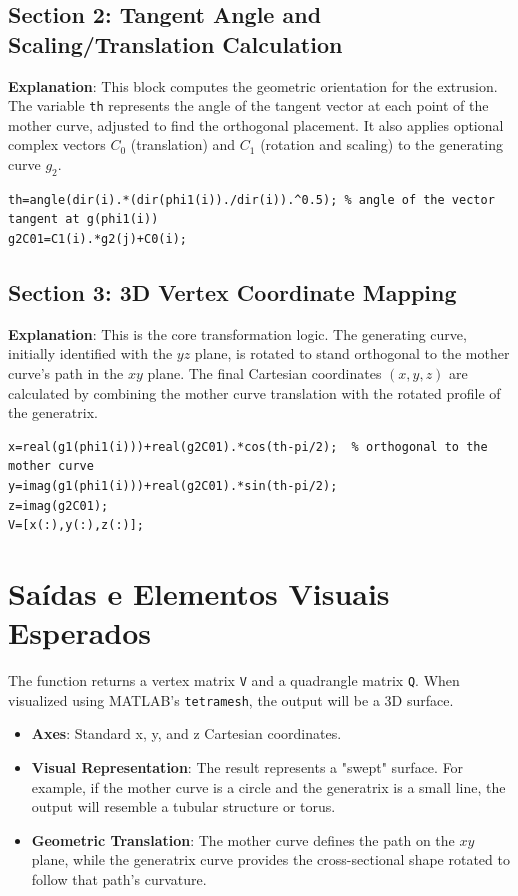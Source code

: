 \subsection{Section 2: Tangent Angle and Scaling/Translation Calculation}
\textbf{Explanation}: This block computes the geometric orientation for the extrusion. The variable \texttt{th} represents the angle of the tangent vector at each point of the mother curve, adjusted to find the orthogonal placement. It also applies optional complex vectors $C_0$ (translation) and $C_1$ (rotation and scaling) to the generating curve $g_2$.

\begin{lstlisting}
th=angle(dir(i).*(dir(phi1(i))./dir(i)).^0.5); % angle of the vector tangent at g(phi1(i))
g2C01=C1(i).*g2(j)+C0(i);
\end{lstlisting}

\subsection{Section 3: 3D Vertex Coordinate Mapping}
\textbf{Explanation}: This is the core transformation logic. The generating curve, initially identified with the $yz$ plane, is rotated to stand orthogonal to the mother curve's path in the $xy$ plane. The final Cartesian coordinates $(x, y, z)$ are calculated by combining the mother curve translation with the rotated profile of the generatrix.

\begin{lstlisting}
x=real(g1(phi1(i)))+real(g2C01).*cos(th-pi/2);  % orthogonal to the mother curve
y=imag(g1(phi1(i)))+real(g2C01).*sin(th-pi/2);
z=imag(g2C01);
V=[x(:),y(:),z(:)];
\end{lstlisting}



\section{Saídas e Elementos Visuais Esperados}

The function returns a vertex matrix \texttt{V} and a quadrangle matrix \texttt{Q}. When visualized using MATLAB's \texttt{tetramesh}, the output will be a 3D surface.

\begin{itemize}
    \item \textbf{Axes}: Standard x, y, and z Cartesian coordinates.
    \item \textbf{Visual Representation}: The result represents a "swept" surface. For example, if the mother curve is a circle and the generatrix is a small line, the output will resemble a tubular structure or torus.
    \item \textbf{Geometric Translation}: The mother curve defines the path on the $xy$ plane, while the generatrix curve provides the cross-sectional shape rotated to follow that path's curvature.
\end{itemize}
